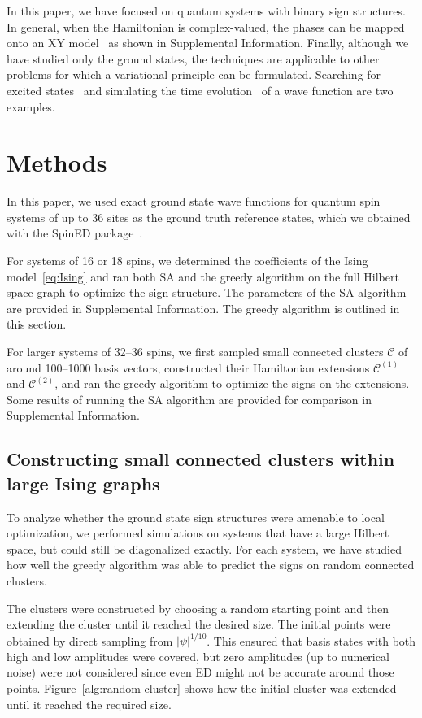 In this paper, we have focused on quantum systems with binary sign structures. In general, when the Hamiltonian is complex-valued, the phases can be mapped onto an XY model~\cite{XY_model} as shown in Supplemental Information. Finally, although we have studied only the ground states, the techniques are applicable to other problems for which a variational principle can be formulated. Searching for excited states~\cite{excited} and simulating the time evolution~\cite{TDVP} of a wave function are two examples.

\section{Methods}

In this paper, we used exact ground state wave functions for quantum spin systems of up to 36 sites as the ground truth reference states, which we obtained with the SpinED package~\cite{SpinED}.

For systems of 16 or 18 spins, we determined the coefficients of the Ising model~\eqref{eq:Ising} and ran both SA and the greedy algorithm on the full Hilbert space graph to optimize the sign structure.
The parameters of the SA algorithm are provided in Supplemental Information.
The greedy algorithm is outlined in this section.

For larger systems of 32--36 spins, we first sampled small connected clusters $\mathcal{C}$ of around 100--1000 basis vectors, constructed their Hamiltonian extensions $\mathcal{C}^{(1)}$ and $\mathcal{C}^{(2)}$, and ran the greedy algorithm to optimize the signs on the extensions.
Some results of running the SA algorithm are provided for comparison in Supplemental Information.

\subsection{Constructing small connected clusters within large Ising graphs}

To analyze whether the ground state sign structures were amenable to local optimization, we performed simulations on systems that have a large Hilbert space, but could still be diagonalized exactly. For each system, we have studied how well the greedy algorithm was able to predict the signs on random connected clusters.

The clusters were constructed by choosing a random starting point and then extending the cluster until it reached the desired size. The initial points were obtained by direct sampling from $|\psi|^{1/10}$. This ensured that basis states with both high and low amplitudes were covered, but zero amplitudes (up to numerical noise) were not considered since even ED might not be accurate around those points. Figure~\ref{alg:random-cluster} shows how the initial cluster was extended until it reached the required size.

